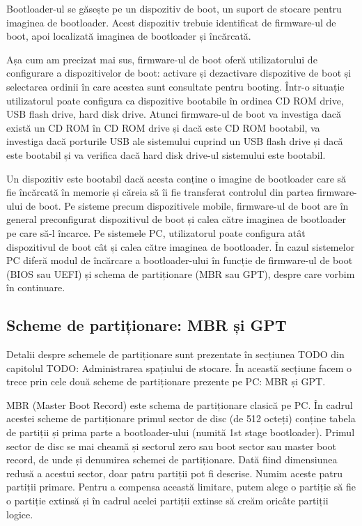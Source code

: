 Bootloader-ul se găsește pe un dispozitiv de boot, un suport de stocare pentru
imaginea de bootloader. Acest dispozitiv trebuie identificat de firmware-ul de
boot, apoi localizată imaginea de bootloader și încărcată.

Așa cum am precizat mai sus, firmware-ul de boot oferă utilizatorului de
configurare a dispozitivelor de boot: activare și dezactivare dispozitive de
boot și selectarea ordinii în care acestea sunt consultate pentru booting.
Într-o situație utilizatorul poate configura ca dispozitive bootabile în ordinea
CD ROM drive, USB flash drive, hard disk drive. Atunci firmware-ul de boot va
investiga dacă există un CD ROM în CD ROM drive și dacă este CD ROM bootabil, va
investiga dacă porturile USB ale sistemului cuprind un USB flash drive și dacă
este bootabil și va verifica dacă hard disk drive-ul sistemului este bootabil.

Un dispozitiv este bootabil dacă acesta conține o imagine de bootloader care să
fie încărcată în memorie și căreia să îi fie transferat controlul din partea
firmware-ului de boot. Pe sisteme precum dispozitivele mobile, firmware-ul de
boot are în general preconfigurat dispozitivul de boot și calea către imaginea
de bootloader pe care să-l încarce. Pe sistemele PC, utilizatorul poate
configura atât dispozitivul de boot cât și calea către imaginea de bootloader.
În cazul sistemelor PC diferă modul de încărcare a bootloader-ului în funcție de
firmware-ul de boot (BIOS sau UEFI) și schema de partiționare (MBR sau GPT),
despre care vorbim în continuare.

\subsection{Scheme de partiționare: MBR și GPT}
\label{sec:boot-bootdev-partscheme}

Detalii despre schemele de partiționare sunt prezentate în secțiunea TODO din
capitolul TODO: Administrarea spațiului de stocare. În această secțiune facem o
trece prin cele două scheme de partiționare prezente pe PC: MBR și GPT.

MBR (Master Boot Record) este schema de partiționare clasică pe PC. În cadrul
acestei scheme de partiționare primul sector de disc (de 512 octeți) conține
tabela de partiții și prima parte a bootloader-ului (numită 1st stage
bootloader). Primul sector de disc se mai cheamă și sectorul zero sau boot
sector sau master boot record, de unde și denumirea schemei de partiționare.
Dată fiind dimensiunea redusă a acestui sector, doar patru partiții pot fi
descrise. Numim aceste patru partiții primare. Pentru a compensa această
limitare, putem alege o partiție să fie o partiție extinsă și în cadrul acelei
partiții extinse să creăm oricâte partiții logice.

